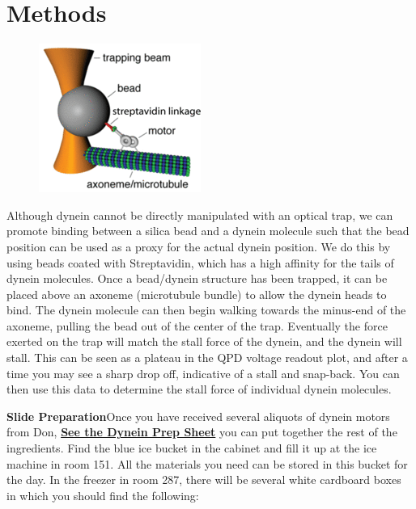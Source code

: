 \documentclass{../lab}
\begin{document}
\section{Methods}


\begin{figure}[h]
    \centering
    \href{http://experimentationlab.berkeley.edu/sites/default/files/images/200px-Dynein_On_Axoneme.gif}{\includegraphics[width=0.5\linewidth]{images/200px-Dynein_On_Axoneme.png}}
    \caption{}
    \label{fig:200px-Dynein_On_Axoneme}
\end{figure}

Although dynein cannot be directly manipulated with an optical trap, we can promote binding between a silica bead and a dynein molecule such that the bead position can be used as a proxy for the actual dynein position. We do this by using beads coated with Streptavidin, which has a high affinity for the tails of dynein molecules. Once a bead/dynein structure has been trapped, it can be placed above an axoneme (microtubule bundle) to allow the dynein heads to bind. The dynein molecule can then begin walking towards the minus-end of the axoneme, pulling the bead out of the center of the trap. Eventually the force exerted on the trap will match the stall force of the dynein, and the dynein will stall. This can be seen as a plateau in the QPD voltage readout plot, and after a time you may see a sharp drop off, indicative of a stall and snap-back. You can then use this data to determine the stall force of individual dynein molecules.

\textbf{Slide Preparation}Once you have received several aliquots of dynein motors from Don, \href{http://experimentationlab.berkeley.edu/sites/default/files/images/Dynein\_OTZ\_Slide\_Prep-Yildiz\_Lab.pdf}{\textbf{See the Dynein Prep Sheet}} you can put together the rest of the ingredients. Find the blue ice bucket in the cabinet and fill it up at the ice machine in room 151. All the materials you need can be stored in this bucket for the day. In the freezer in room 287, there will be several white cardboard boxes in which you should find the following:
\end{document}
